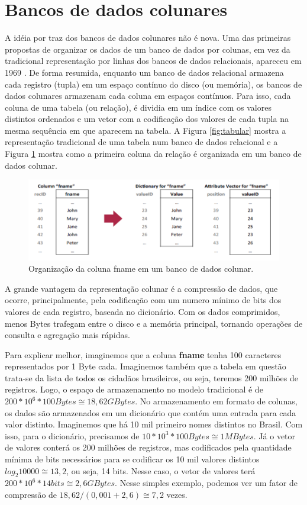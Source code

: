 \section{Bancos de dados colunares} \label{colunar}
A idéia por traz dos bancos de dados colunares não é nova. Uma das primeiras propostas de organizar os dados de um banco de dados por colunas, em vez da tradicional representação por linhas dos bancos de dados relacionais, apareceu em 1969 \cite{Estabrook1969327}. De forma resumida, enquanto um banco de dados relacional armazena cada registro (tupla) em um espaço contínuo do disco (ou memória), os bancos de dados colunares armazenam cada coluna em espaços contínuos. Para isso, cada coluna de uma tabela (ou relação), é dividia em um índice com os valores distintos ordenados e um vetor com a codificação dos valores de cada tupla na mesma sequência em que aparecem na tabela. A Figura \ref{fig:tabular} mostra a representação tradicional de uma tabela num banco de dados relacional e a Figura \ref{fig:colunar} mostra como a primeira coluna da relação é organizada em um banco de dados colunar.

\begin{figure}
	\centering
	\includegraphics[width=\linewidth]{./colunar_repr_coluna.png}
	\caption{Organização da coluna fname em um banco de dados colunar.}
	\label{fig:colunar}
\end{figure}

A grande vantagem da representação colunar é a compressão de dados, que ocorre, principalmente, pela codificação com um numero mínimo de bits dos valores de cada registro, baseada no dicionário. Com os dados comprimidos, menos Bytes trafegam entre o disco e a memória principal, tornando operações de consulta e agregação mais rápidas.

Para explicar melhor, imaginemos que a coluna \textbf{fname} tenha 100 caracteres representados por 1 Byte cada. Imaginemos também que a tabela em questão trata-se da lista de todos os cidadãos brasileiros, ou seja, teremos 200 milhões de registros. Logo, o espaço de armazenamento no modelo tradicional é de $ 200*10^6 * 100 Bytes \cong 18,62 GBytes  $. No armazenamento em formato de colunas, os dados são armazenados em um dicionário que contém uma entrada para cada valor distinto. Imaginemos que há 10 mil primeiro nomes distintos no Brasil. Com isso, para o dicionário, precisamos de $ 10*10^3 * 100 Bytes \cong 1 MBytes  $. Já o vetor de valores conterá os 200 milhões de registros, mas codificados pela quantidade mínima de bits necessários para se codificar os 10 mil valores distintos $ log_2 10000 \cong 13,2  $, ou seja, 14 bits. Nesse caso, o vetor de valores terá $ 200*10^6 * 14 bits \cong 2,6 GBytes  $. Nesse simples exemplo, podemos ver um fator de compressão de $ 18,62 / (0,001 + 2,6) \cong 7,2 $ vezes.

